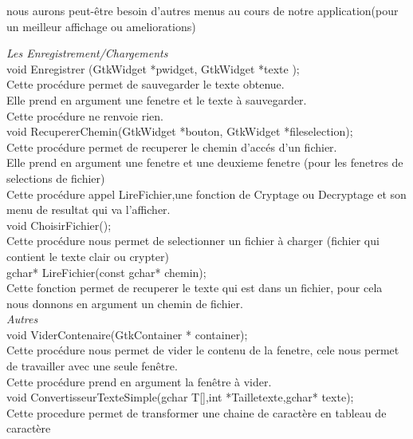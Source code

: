 \documentclass[a4]{article}
\begin{document}
	nous aurons peut-être besoin d'autres menus au cours de notre 
	application(pour un meilleur affichage ou ameliorations) 
	
	\textit{Les Enregistrement/Chargements}\\
	
	void Enregistrer (GtkWidget *pwidget, GtkWidget *texte );\\
		Cette procédure permet de sauvegarder le texte obtenue.\\
		Elle prend en argument une fenetre et le texte à sauvegarder.\\
		Cette procédure ne renvoie rien.\\
	
	void RecupererChemin(GtkWidget *bouton, GtkWidget *fileselection);\\
		Cette procédure permet de recuperer le chemin d'accés d'un fichier.\\
		Elle prend en argument une fenetre et une deuxieme fenetre (pour les fenetres de selections de fichier)\\
		Cette procédure appel LireFichier,une fonction de Cryptage ou Decryptage et son menu de resultat qui va l'afficher.\\
		

	void ChoisirFichier();\\
		Cette procédure nous permet de selectionner un fichier à charger (fichier qui contient le texte clair ou 		crypter)\\

		
	gchar* LireFichier(const gchar* chemin);\\
		Cette fonction permet de recuperer le texte qui est dans un fichier, pour cela nous donnons en argument un chemin de fichier.\\
	
	\textit{Autres}\\
	
	void ViderContenaire(GtkContainer * container);\\
		Cette procédure nous permet de vider le contenu de la fenetre, cele nous permet de travailler avec une seule fenêtre.\\
		Cette procédure prend en argument la fenêtre à vider.\\
	
	void ConvertisseurTexteSimple(gchar T[],int *Tailletexte,gchar* texte);\\
		Cette procedure permet de transformer une chaine de caractère en tableau de caractère\\
	 
\end{document}
